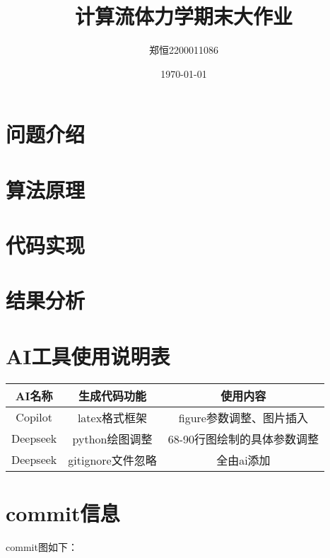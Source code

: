 \documentclass[12pt,a4paper]{article}
\title{计算流体力学期末大作业}
\author{郑恒2200011086}
\date{\today}
\begin{document}
\maketitle

\section{问题介绍}

\section{算法原理}



\section{代码实现}

\newpage   
\section{结果分析}

\section{AI工具使用说明表}
\begin{table}[!htbp]
    \centering
    \begin{tabular}{|c|c|c|}
        \hline
        \textbf{AI名称} & \textbf{生成代码功能} & \textbf{使用内容} \\
        \hline
        Copilot & latex格式框架 & figure参数调整、图片插入\\
        \hline
        Deepseek & python绘图调整 & 68-90行图绘制的具体参数调整\\
        \hline
        Deepseek & gitignore文件忽略 & 全由ai添加\\
        \hline
\end{tabular}
\end{table}
\section{commit信息}
commit图如下：
\end{document}
